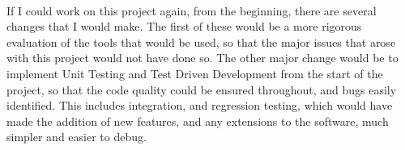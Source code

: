 \ \\
If I could work on this project again, from the beginning, there are several changes that I would make. The first of these would be a more rigorous evaluation of the tools that would be used, so that the major issues that arose with this project would not have done so. The other major change would be to implement Unit Testing and Test Driven Development from the start of the project, so that the code quality could be ensured throughout, and bugs easily identified. This includes integration, and regression testing, which would have made the addition of new features, and any extensions to the software, much simpler and easier to debug.